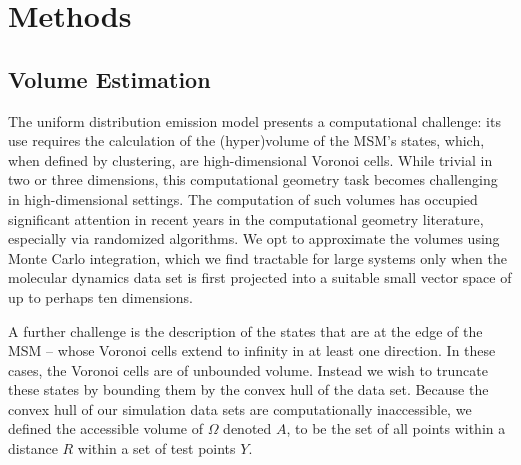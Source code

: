 \documentclass[journal=jpcbfk, layout=traditional, manuscript=article]{achemso}
\begin{document}

\section{Methods}
\label{sec:methods}

\subsection{Volume Estimation}
The uniform distribution emission model presents a computational challenge: its use requires the calculation of the (hyper)volume of the MSM's states, which, when defined by clustering, are high-dimensional Voronoi cells. While trivial in two or three dimensions, this computational geometry task becomes challenging in high-dimensional settings. The computation of such volumes has occupied significant attention in recent years in the computational geometry literature, especially via randomized algorithms\cite{Kannan97, Simonovits03, Lovasz03}. We opt to approximate the volumes using Monte Carlo integration, which we find tractable for large systems only when the molecular dynamics data set is first projected into a suitable small vector space of up to perhaps ten dimensions.

A further challenge is the description of the states that are at the edge of the MSM -- whose Voronoi cells extend to infinity in at least one direction. In these cases, the Voronoi cells are of unbounded volume. Instead we wish to truncate these states by bounding them by the convex hull of the data set. Because the convex hull of our simulation data sets are computationally inaccessible, we defined the accessible volume of $\Omega$ denoted $A$, to be the set of all points within a distance $R$ within a set of test points $Y$.
\end{document}
